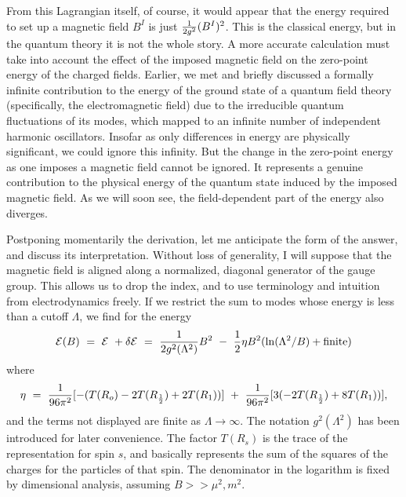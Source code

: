 \documentclass[aps,epsf]{revtex4}
\begin{document}
{}From this Lagrangian itself, of course, it would
appear that the energy required to set up a magnetic field $B^I$ is
just ${1\over 2 g^2} (B^I)^2$.  This is the classical energy, but in
the quantum theory it is not the whole story.  A more accurate
calculation must take into account the effect of the imposed magnetic
field on the zero-point energy of the charged fields.  Earlier, we met
and briefly discussed a formally infinite contribution to the energy
of the ground state of a quantum field theory (specifically, the
electromagnetic field) due to the irreducible quantum fluctuations of
its modes, which mapped to an infinite number of independent harmonic
oscillators.  Insofar as only differences in energy are physically
significant, we could ignore this infinity.  But the change in the
zero-point energy as one imposes a magnetic field cannot be ignored.
It represents a genuine contribution to the physical energy of the
quantum state induced by the imposed magnetic field.  As we will soon
see, the field-dependent part of the energy also diverges.  

Postponing
momentarily the derivation, let me anticipate the form of the answer,
and discuss its interpretation.  Without loss of generality, I will
suppose that the magnetic field is aligned along a normalized,
diagonal generator of the gauge group.  This allows us to drop the
index, and to use terminology and intuition from electrodynamics
freely.  If we restrict the sum to modes whose energy is less than a
cutoff $\Lambda$, we find for the energy
\begin{equation}{\cal E}(B)
~=~ {\cal E}~ + \delta {\cal E}~= ~ {1\over 2 g^2 (\Lambda^2) } B^2 ~-
~{1\over 2} \eta B^2 ( \ln (\Lambda^2/B) + {\rm finite} )
\label{eq:eng}
\end{equation}
where 
\begin{equation}\eta ~=~ {1\over 96
\pi^2} [ - (T(R_o) -2T(R_{1\over 2}) + 2T(R_1) ) ] ~+~ {1\over 96
\pi^2} [3(-2T(R_{1\over 2}) + 8T(R_1))],
\label{eq:lncoeff}
\end{equation}
and the terms not displayed are finite
as $\Lambda \rightarrow \infty$.  The notation $g^2(\Lambda^2)$ has
been introduced for later convenience.  The factor $T(R_s)$ is the
trace of the representation for spin $s$, and basically represents the
sum of the squares of the charges for the particles of that spin.  The
denominator in the logarithm is fixed by dimensional analysis,
assuming $B >> \mu^2, m^2$.  
\end{document}
